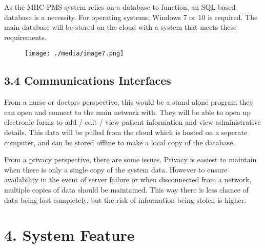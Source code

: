 \documentclass[12pt]{article}
\renewcommand{\_}{\kern-1.5pt\textunderscore\kern-1.5pt}
\begin{document}
\tab As the MHC-PMS system relies on a database to function, an SQL-based database is a necessity. For operating systems, Windows 7 or 10 is required. The main database will be stored on the cloud with a system that meets these requirements. \par





\begin{figure}[H]
	\begin{Center}
		\texttt{[image: ./media/image7.png]}
	\end{Center}
\end{figure}




\par

\subsection*{3.4 \hspace*{10pt}Communications Interfaces}
\setlength{\parskip}{12.0pt}
From a nurse or doctors perspective, this would be a stand-alone program they can open and connect to the main network with. They will be able to open up electronic forms to add / edit / view patient information and view administrative details. This data will be pulled from the cloud which is hosted on a seperate computer, and can be stored offline to make a local copy of the database. \par

From a privacy perspective, there are some issues. Privacy is easiest to maintain when there is only a single copy of the system data. However to ensure availability in the event of server failure or when disconnected from a network, multiple copies of data should be maintained. This way there is less chance of data being lost completely, but the risk of information being stolen is higher.\par


\vspace{\baselineskip}

\vspace{\baselineskip}
\section*{4. \hspace*{10pt}System Feature}
\setlength{\parskip}{3.96pt}
\end{document}
